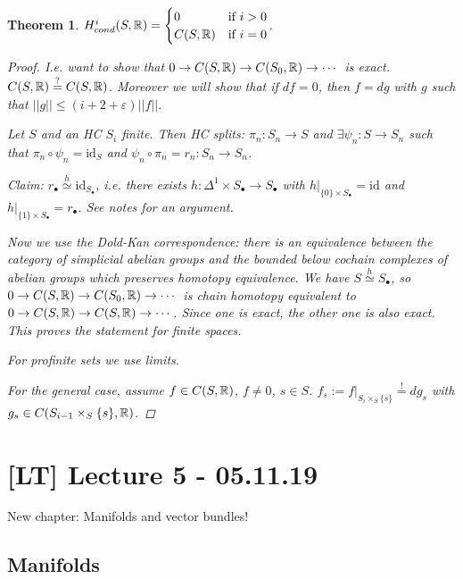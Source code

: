 \documentclass[A4paper, british, reqno]{amsart}
\theoremstyle{darkgreentheorem}
\newtheorem{thm}{Theorem}[section]
\theoremstyle{darkbluedefinition}
\theoremstyle{darkredexample}
\theoremstyle{remark}
\newcommand{\1}{\mathbbm{1}}
\newcommand{\fp}[1]{\times_{#1}}
\newcommand{\id}{\mathrm{id}}
\begin{document}
\begin{thm}
    $H^{i}_{cond}(S,\mathbb{R})=\begin{cases} 0 & \text{if } i>0 \\ C(S,\mathbb{R}) & \text{if } i=0 \end{cases}$.
	\begin{proof}
	    I.e. want to show that $0\to C(S,\mathbb{R})\to C(S_{0},\mathbb{R})\to \cdots $ is exact.
	    $C(S,\mathbb{R})\overset{?}{=} C(S,\mathbb{R})$.
	    Moreover we will show that if $df=0$, then $f=dg$ with $g$ such that $||g||\leqslant (i+2+\varepsilon )||f||$.

	    Let $S$ and an HC $S_{i}$ finite.
	    Then HC splits: $\pi_{n}\colon S_{n}\to S$ and $\exists \psi_{n}\colon S\to S_{n}$ such that $\pi_{n}\circ \psi_{n}=\id_{S}$ and $\psi_{n}\circ \pi_{n}=r_{n}\colon S_{n}\to S_{n}$.

	    Claim: $r_{\bullet}\overset{h}{\simeq} \id_{S_{\bullet}}$, i.e. there exists $h\colon \Delta^{1}\times S_{\bullet}\to S_{\bullet}$ with $h|_{\{0\}\times S_{\bullet}}=\id$ and $h|_{\{ 1\}\times S_{\bullet}}=r_{\bullet}$.
	    See notes for an argument.

	    Now we use the Dold-Kan correspondence: there is an equivalence between the category of simplicial abelian groups and the bounded below cochain complexes of abelian groups which preserves homotopy equivalence.
	    We have $S\overset{h}{\simeq}S_{\bullet}$, so $0\to C(S,\mathbb{R})\to C(S_{0},\mathbb{R})\to \cdots$ is chain homotopy equivalent to $0\to C(S,\mathbb{R})\to C(S,\mathbb{R})\to \cdots$.
	    Since one is exact, the other one is also exact.
	    This proves the statement for finite spaces.

	    For profinite sets we use limits.

	    For the general case, assume $f\in C(S,\mathbb{R})$, $f\neq 0$, $s\in S$.
	    $f_{s}:=f|_{S_{i}\fp{S}\{s\}}\overset{!}{=}dg_{s}$ with $g_{s}\in C(S_{i-1}\fp{S}\{s\},\R)$.
	\end{proof}
\end{thm}

\section{[LT] Lecture 5 - 05.11.19}

New chapter: Manifolds and vector bundles!

\subsection{Manifolds}
\end{document}
